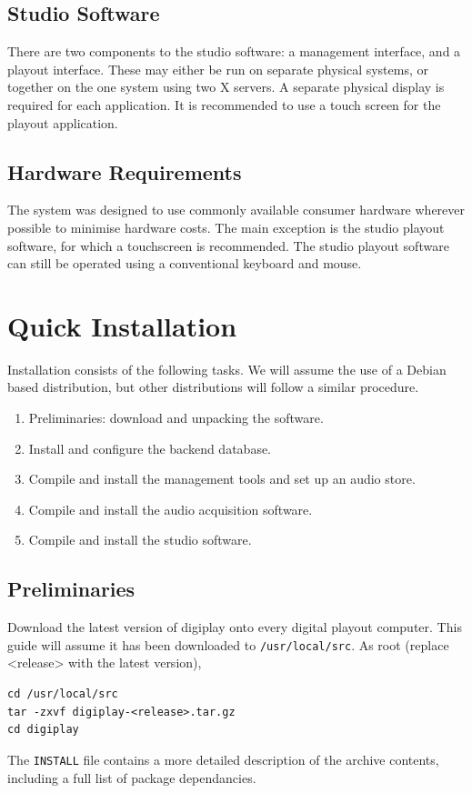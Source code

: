 \documentclass[a4paper,12pt]{report}
\numberwithin{equation}{section}
\begin{document}
\section{Studio Software}
There are two components to the studio software: a management interface, and a playout interface. These may either be run on separate physical systems, or together on the one system using two X servers. A separate physical display is required for each application. It is recommended to use a touch screen for the playout application.

\section{Hardware Requirements}
The system was designed to use commonly available consumer hardware wherever possible to minimise hardware costs. The main exception is the studio playout software, for which a touchscreen is recommended. The studio playout software can still be operated using a conventional keyboard and mouse.

\chapter{Quick Installation}
Installation consists of the following tasks. We will assume the use of a Debian based distribution, but other distributions will follow a similar procedure.
\begin{enumerate}
\item Preliminaries: download and unpacking the software.
\item Install and configure the backend database.
\item Compile and install the management tools and set up an audio store.
\item Compile and install the audio acquisition software.
\item Compile and install the studio software.
\end{enumerate}

\section{Preliminaries}
Download the latest version of digiplay onto every digital playout computer. This guide will assume it has been downloaded to \texttt{/usr/local/src}. As root (replace <release> with the latest version),
\begin{lstlisting}
cd /usr/local/src
tar -zxvf digiplay-<release>.tar.gz
cd digiplay
\end{lstlisting}
The \texttt{INSTALL} file contains a more detailed description of the archive contents, including a full list of package dependancies.
\end{document}
